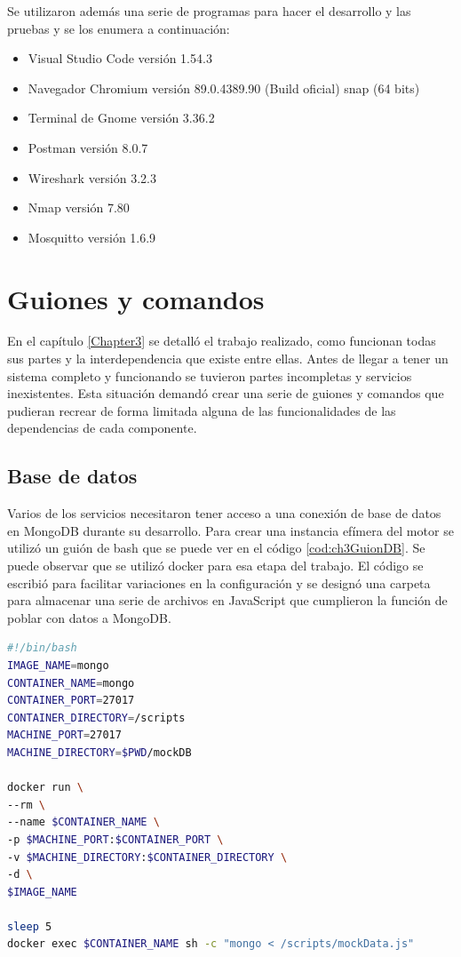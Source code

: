 Se utilizaron además una serie de programas para hacer el desarrollo y las pruebas y se los enumera a continuación:

\begin{itemize}
	\item Visual Studio Code versión 1.54.3
	\item Navegador Chromium versión 89.0.4389.90 (Build oficial) snap (64 bits)
	\item Terminal de Gnome versión 3.36.2
	\item Postman versión 8.0.7
	\item Wireshark versión 3.2.3
	\item Nmap versión 7.80
	\item Mosquitto versión 1.6.9
\end{itemize}

\section{Guiones y comandos}
En el capítulo \ref{Chapter3} se detalló el trabajo realizado, como funcionan todas sus partes y la interdependencia que existe entre ellas. Antes de llegar a tener un sistema completo y funcionando se tuvieron partes incompletas y servicios inexistentes. Esta situación demandó crear una serie de guiones y comandos que pudieran recrear de forma limitada alguna de las funcionalidades de las dependencias de cada componente.

\subsection{Base de datos}

Varios de los servicios necesitaron tener acceso a una conexión de base de datos en MongoDB durante su desarrollo.
Para crear una instancia efímera del motor se utilizó un guión de bash que se puede ver en el código \ref{cod:ch3GuionDB}.
Se puede observar que se utilizó docker para esa etapa del trabajo.
El código se escribió para facilitar variaciones en la configuración y se designó una carpeta para almacenar una serie de archivos en JavaScript que cumplieron la función de poblar con datos a MongoDB.

\begin{lstlisting}[language=bash,label=cod:ch3GuionDB,caption=Guión de base de datos.]
#!/bin/bash
IMAGE_NAME=mongo
CONTAINER_NAME=mongo
CONTAINER_PORT=27017
CONTAINER_DIRECTORY=/scripts
MACHINE_PORT=27017
MACHINE_DIRECTORY=$PWD/mockDB

docker run \
--rm \
--name $CONTAINER_NAME \
-p $MACHINE_PORT:$CONTAINER_PORT \
-v $MACHINE_DIRECTORY:$CONTAINER_DIRECTORY \
-d \
$IMAGE_NAME

sleep 5
docker exec $CONTAINER_NAME sh -c "mongo < /scripts/mockData.js"
\end{lstlisting}

